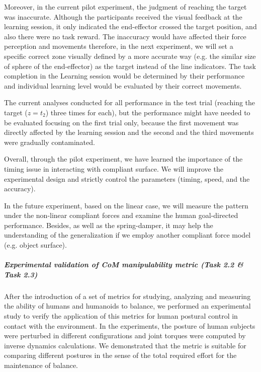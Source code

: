 Moreover, in the current pilot experiment, the judgment of reaching the target was inaccurate. Although the participants received the visual feedback at the learning session, it only indicated the end-effector crossed the target position, and also there were no task reward. The inaccuracy would have affected their force perception and movements \cite{Rank&DiLuca15} therefore, in the next experiment, we will set a specific correct zone visually defined by a more accurate way (e.g. the similar size of sphere of the end-effector) as the target instead of the line indicators. The task completion in the Learning session would be determined by their performance and individual learning level would be evaluated by their correct movements.

The current analyses conducted for all performance in the test trial (reaching the target ($z= t_2$) three times for each), but the performance might have needed to be evaluated focusing on the first trial only, because the first movement was directly affected by the learning session and the second and the third movements were gradually contaminated.

Overall, through the pilot experiment, we have learned the importance of the timing issue in interacting with compliant surface. We will improve the experimental design and strictly control the parameters (timing, speed, and the accuracy). 

In the future experiment, based on the linear case, we will measure the pattern under the non-linear compliant forces and examine the human goal-directed performance. Besides, as well as the spring-damper, it may help the understanding of the generalization if we employ another compliant force model (e.g. object surface).



\subparagraph*{Experimental validation of CoM manipulability metric (Task 2.2 \& Task 2.3)}

After the introduction of a set of metrics for studying, analyzing and measuring the ability of humans and humanoids to balance, we performed an experimental study to verify the application of this metrics for human postural control in contact with the environment. In the experiments, the posture of human subjects were perturbed in different configurations and joint torques were computed by inverse dynamics calculations. We demonstrated that the metric is suitable for comparing different postures in the sense of the total required effort for the maintenance of balance.


